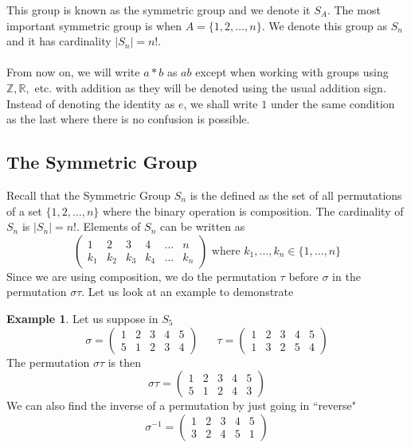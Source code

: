 \documentclass{article}
\newcommand{\R}{\mathbb{R}}
\newcommand{\Z}{\mathbb{Z}}
\newcommand{\twen}{\hspace{20pt}}
\theoremstyle{definition}
\newtheorem{example}[theorem]{Example}
\begin{document}
This group is known as the symmetric group and we denote it $S_A$. The most important symmetric group is when $A=\{1,2,\ldots,n\}$. We denote this group as $S_n$ and it has cardinality $|S_n|=n!$.\\\\ From now on, we will write $a*b$ as $ab$ except when working with groups using $\Z,\R,$ etc. with addition as they will be denoted using the usual addition sign. Instead of denoting the identity as $e$, we shall write $1$ under the same condition as the last where there is no confusion is possible.
\subsection{The Symmetric Group}
Recall that the Symmetric Group $S_n$ is the defined as the set of all permutations of a set $\{1,2,\ldots,n\}$ where the binary operation is composition. The cardinality of $S_n$ is $|S_n|=n!$. Elements of $S_n$ can be written as 
\begin{equation*}
    \begin{pmatrix}
        1&2&3&4&\ldots&n \\k_1&k_2&k_3&k_4&\ldots &k_n
    \end{pmatrix} \text{ where } k_1,\ldots,k_n \in \{1,\ldots, n\}
\end{equation*}
Since we are using composition, we do the permutation $\tau$ before $\sigma$ in the permutation $\sigma \tau$. Let us look at an example to demonstrate 
\begin{example}
    Let us suppose in $S_5$ 
    \begin{equation*}
        \sigma = \begin{pmatrix}
            1&2&3&4&5 \\5&1&2&3&4
        \end{pmatrix} \twen \tau=\begin{pmatrix}
            1&2&3&4&5\\1&3&2&5&4
        \end{pmatrix}
    \end{equation*}
    The permutation $\sigma\tau$ is then 
    \begin{equation*}
        \sigma \tau = \begin{pmatrix}
            1&2&3&4&5\\5&1&2&4&3
        \end{pmatrix}
    \end{equation*}
    We can also find the inverse of a permutation by just going in ``reverse"
    \begin{equation*}
        \sigma^{-1} = \begin{pmatrix}
            1&2&3&4&5 \\3&2&4&5&1
        \end{pmatrix}
    \end{equation*}
\end{example}
\end{document}
